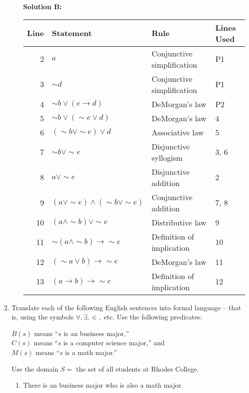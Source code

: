 \documentclass[12pt, letterpaper]{report}
\newcommand{\nott}{{\sim}}
\begin{document}
\begin{enumerate}
\begin{enumerate}
\textbf{Solution B:}

\begin{tabular}{|r|l|l|l|} \hline
Line & Statement & Rule & Lines Used \\ \hline
2 & $a$ & Conjunctive simplification & P1\\ \hline
3 & $\nott d$ & Conjunctive simplification & P1\\ \hline
4 & $\nott b \lor (e \to d)$ & DeMorgan's law & P2\\ \hline
5 & $\nott b \lor (\nott e \lor d)$ & DeMorgan's law & 4\\ \hline
6 & $(\nott b \lor \nott e) \lor d$ & Associative law & 5\\ \hline
7 & $\nott b \lor \nott e $ & Disjunctive syllogism & 3, 6\\ \hline
8 & $a \lor \nott e $ & Disjunctive addition & 2\\ \hline
9 & $(a \lor \nott e) \land (\nott b \lor \nott e) $ & Conjunctive addition & 7, 8\\ \hline
10& $(a \land \nott b) \lor \nott e$ & Distributive law & 9 \\ \hline
11& $\nott (a \land \nott b) \to \nott e$ & Definition of implication & 10 \\ \hline
12& $(\nott a \lor b) \to \nott e$ & DeMorgan's law& 11 \\ \hline
13& $(a \to b) \to \nott e$ & Definition of implication& 12 \\ \hline
\end{tabular}



\end{enumerate}

        \item Translate each of the following English sentences into formal language -- that is, using the symbols $\forall, \exists, \in,$ etc.  Use the following predicates: 
        
        $B(s)$ means ``$s$ is an business major,'' \\
        $C(s)$ means ``$s$ is a computer science
        major,'' and \\
        $M(s)$ means ``$s$ is a math major.'' 
        
         Use the domain $S = $ the set of
        all students at Rhodes College.
        
        \begin{enumerate}
                \item There is an business major who is also a math major.
                

\end{enumerate}
\end{enumerate}
\end{document}

